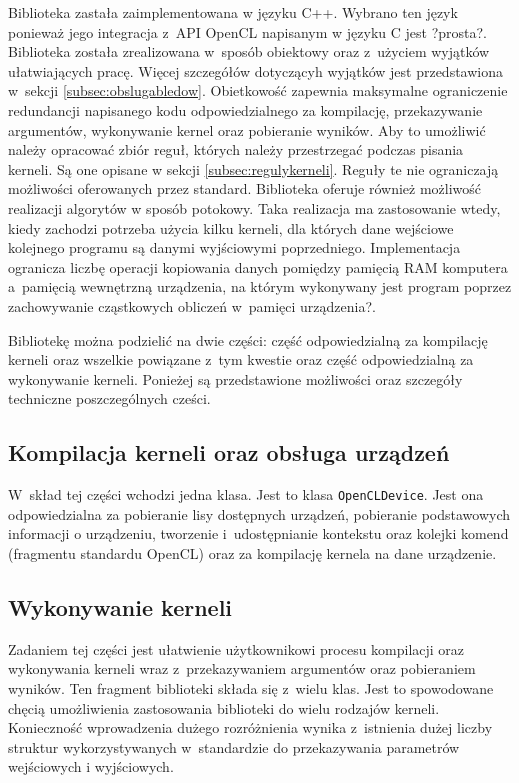 Biblioteka zastała zaimplementowana w języku C++. Wybrano ten język ponieważ jego integracja z~API OpenCL napisanym w języku C jest ?prosta?. Biblioteka została zrealizowana w~sposób obiektowy oraz z~użyciem wyjątków ułatwiających pracę. Więcej szczegółów dotyczącyh wyjątków jest przedstawiona w~sekcji \ref{subsec:obslugabledow}. Obietkowość zapewnia maksymalne ograniczenie redundancji napisanego kodu odpowiedzialnego za kompilację, przekazywanie argumentów, wykonywanie kernel oraz pobieranie wyników. Aby to umożliwić należy opracować zbiór reguł, których należy przestrzegać podczas pisania kerneli. Są one opisane w sekcji \ref{subsec:regulykerneli}. Reguły te nie ograniczają możliwości oferowanych przez standard. Biblioteka oferuje również możliwość realizacji algorytów w sposób potokowy. Taka realizacja ma zastosowanie wtedy, kiedy zachodzi potrzeba użycia kilku kerneli, dla których dane wejściowe kolejnego programu są danymi wyjściowymi poprzedniego. Implementacja  ogranicza liczbę operacji kopiowania danych pomiędzy pamięcią RAM komputera a~pamięcią wewnętrzną urządzenia, na którym wykonywany jest program poprzez zachowywanie cząstkowych obliczeń w~pamięci urządzenia?.

Bibliotekę można podzielić na dwie części: część odpowiedzialną za kompilację kerneli oraz wszelkie powiązane z~tym kwestie oraz część odpowiedzialną za wykonywanie kerneli.
Ponieżej są przedstawione możliwości oraz szczegóły techniczne poszczególnych cześci.

\subsection{Kompilacja kerneli oraz obsługa urządzeń}
\label{subsec:kompilacjakerneli}
W~skład tej części wchodzi jedna klasa. Jest to klasa \lstinline{OpenCLDevice}. Jest ona odpowiedzialna za pobieranie lisy dostępnych urządzeń, pobieranie podstawowych informacji o urządzeniu, tworzenie i~udostępnianie kontekstu oraz kolejki komend (fragmentu standardu OpenCL) oraz za kompilację kernela na dane urządzenie. 

\subsection{Wykonywanie kerneli}
\label{subsec:wykonywaniekerneli}
Zadaniem tej części jest ułatwienie użytkownikowi procesu kompilacji oraz wykonywania kerneli wraz z~przekazywaniem argumentów oraz pobieraniem wyników. Ten fragment biblioteki składa się z~wielu klas. Jest to spowodowane chęcią umożliwienia zastosowania biblioteki do wielu rodzajów kerneli. Konieczność wprowadzenia dużego rozróżnienia wynika z~istnienia dużej liczby struktur wykorzystywanych w~standardzie do przekazywania parametrów wejściowych i wyjściowych.



